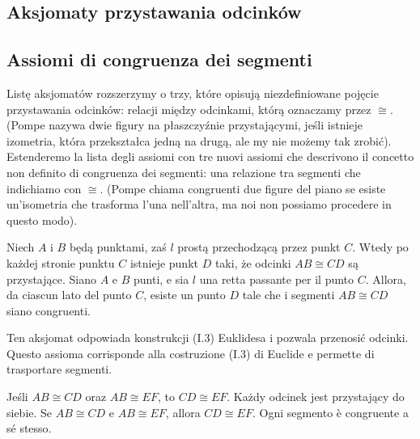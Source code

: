 
%

\subsection{Aksjomaty przystawania odcinków} %
\subsection{Assiomi di congruenza dei segmenti} %

Listę aksjomatów rozszerzymy o trzy, które opisują niezdefiniowane pojęcie przystawania odcinków: relacji między odcinkami, którą oznaczamy przez $\cong$. %
(Pompe \cite[s. 25]{pompe_2022} nazywa dwie figury na płaszczyźnie przystającymi, jeśli istnieje izometria, która przekształca jedną na drugą, ale my nie możemy tak zrobić). %
Estenderemo la lista degli assiomi con tre nuovi assiomi che descrivono il concetto non definito di congruenza dei segmenti: una relazione tra segmenti che indichiamo con $\cong$. %
(Pompe \cite[p. 25]{pompe_2022} chiama congruenti due figure del piano se esiste un'isometria che trasforma l'una nell'altra, ma noi non possiamo procedere in questo modo). %

\begin{axiom}
[przystawania, C1] %
[congruenza, C1] %
    Niech $A$ i $B$ będą punktami, zaś $l$ prostą przechodzącą przez punkt $C$. %
    Wtedy po każdej stronie punktu $C$ istnieje punkt $D$ taki, że odcinki $AB \cong CD$ są przystające. %
    Siano $A$ e $B$ punti, e sia $l$ una retta passante per il punto $C$. %
    Allora, da ciascun lato del punto $C$, esiste un punto $D$ tale che i segmenti $AB \cong CD$ siano congruenti. %
\end{axiom}

Ten aksjomat odpowiada konstrukcji (I.3) Euklidesa i pozwala przenosić odcinki. %
Questo assioma corrisponde alla costruzione (I.3) di Euclide e permette di trasportare segmenti. %

\begin{axiom}
[przystawania, C2] %
[congruenza, C2] %
    Jeśli $AB \cong CD$ oraz $AB \cong EF$, to $CD \cong EF$. %
    Każdy odcinek jest przystający do siebie. %
    Se $AB \cong CD$ e $AB \cong EF$, allora $CD \cong EF$. %
    Ogni segmento è congruente a sé stesso. %
\end{axiom}

